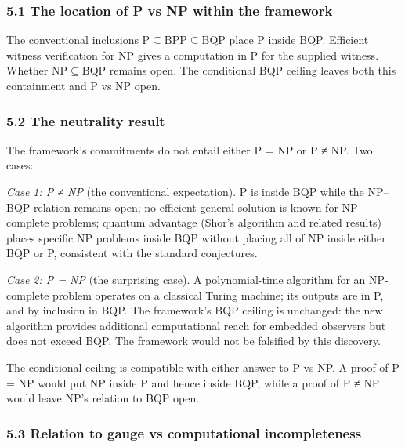 \documentclass[
]{article}
\begin{document}
\hypertarget{the-location-of-p-vs-np-within-the-framework}{%
\subsubsection{5.1 The location of P vs NP within the
framework}\label{the-location-of-p-vs-np-within-the-framework}}

The conventional inclusions
\(\mathrm{P} \subseteq \mathrm{BPP} \subseteq \mathrm{BQP}\) place P
inside BQP. Efficient witness verification for NP gives a computation in
P for the supplied witness. Whether
\(\mathrm{NP} \subseteq \mathrm{BQP}\) remains open. The conditional BQP
ceiling leaves both this containment and P vs NP open.

\hypertarget{the-neutrality-result}{%
\subsubsection{5.2 The neutrality result}\label{the-neutrality-result}}

The framework's commitments do not entail either P = NP or P ≠ NP. Two
cases:

\emph{Case 1: P ≠ NP} (the conventional expectation). P is inside BQP
while the NP--BQP relation remains open; no efficient general solution
is known for NP-complete problems; quantum advantage (Shor's algorithm
and related results) places specific NP problems inside BQP without
placing all of NP inside either BQP or P, consistent with the standard
conjectures.

\emph{Case 2: P = NP} (the surprising case). A polynomial-time algorithm
for an NP-complete problem operates on a classical Turing machine; its
outputs are in P, and by inclusion in BQP. The framework's BQP ceiling
is unchanged: the new algorithm provides additional computational reach
for embedded observers but does not exceed BQP. The framework would not
be falsified by this discovery.

The conditional ceiling is compatible with either answer to P vs NP. A
proof of P = NP would put NP inside P and hence inside BQP, while a
proof of P ≠ NP would leave NP's relation to BQP open.

\hypertarget{relation-to-gauge-vs-computational-incompleteness}{%
\subsubsection{5.3 Relation to gauge vs computational
incompleteness}\label{relation-to-gauge-vs-computational-incompleteness}}
\end{document}
